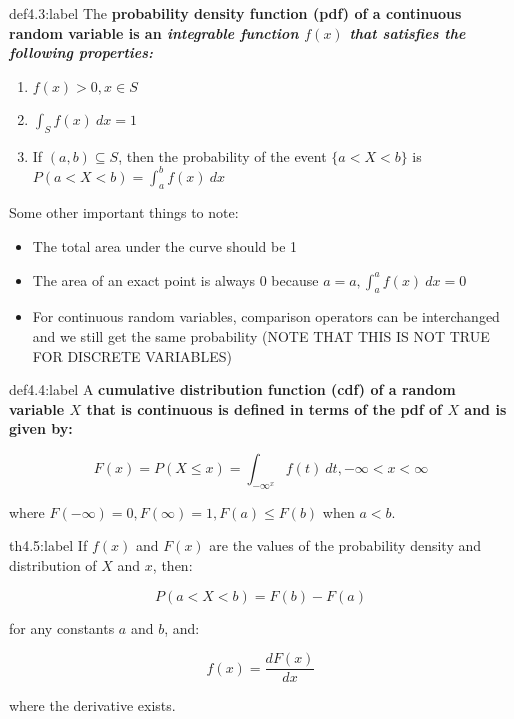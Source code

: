 \begin{definition}{def4.3:label}
    The \bf{probability density function (pdf)} of a continuous random variable is an \it{integrable} function $f(x)$ that satisfies the following properties:

    \begin{enumerate}
        \item $f(x) > 0, x \in S$
        \item $\int_S f(x)\:dx = 1$
        \item If $(a,b) \subseteq S$, then the probability of the event $\{a < X < b\}$ is\\ $P(a < X < b) = \int_a^b f(x)\:dx$
    \end{enumerate}

    Some other important things to note:

    \begin{itemize}
        \item The total area under the curve should be 1
        \item The area of an exact point is always 0 because $a=a, \int_a^a f(x)\:dx = 0$
        \item For continuous random variables, comparison operators can be interchanged and we still get the same probability (NOTE THAT THIS IS NOT TRUE FOR DISCRETE VARIABLES)
    \end{itemize}
\end{definition}

\begin{definition}{def4.4:label}
    A \bf{cumulative distribution function (cdf)} of a random variable $X$ that is continuous is defined in terms of the pdf of $X$ and is given by:

    $$
    F(x) = P(X \le x) = \int_{-\infty^x}f(t)\:dt, -\infty < x < \infty
    $$

    where $F(-\infty) = 0, F(\infty) = 1, F(a) \le F(b)$ when $a<b$.
\end{definition}

\begin{theorem}{th4.5:label}
    If $f(x)$ and $F(x)$ are the values of the probability density and distribution of $X$ and $x$, then:

    $$
    P(a < X < b) = F(b) - F(a)
    $$

    for any constants $a$ and $b$, and:

    $$
    f(x) = \frac{dF(x)}{dx}
    $$

    where the derivative exists.
\end{theorem}


